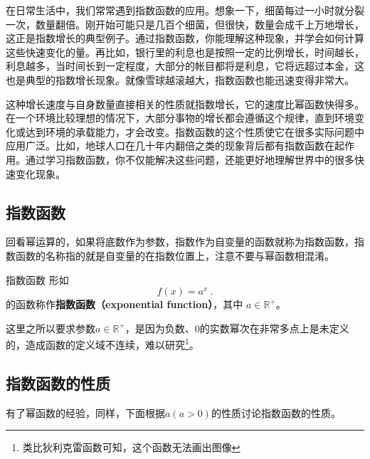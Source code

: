 

\begin{issues}
\issueDraft
\end{issues}

在日常生活中，我们常常遇到指数函数的应用。想象一下，细菌每过一小时就分裂一次，数量翻倍。刚开始可能只是几百个细菌，但很快，数量会成千上万地增长，这正是指数增长的典型例子。通过指数函数，你能理解这种现象，并学会如何计算这些快速变化的量。再比如，银行里的利息也是按照一定的比例增长，时间越长，利息越多，当时间长到一定程度，大部分的帐目都将是利息，它将远超过本金，这也是典型的指数增长现象。就像雪球越滚越大，指数函数也能迅速变得非常大。

这种增长速度与自身数量直接相关的性质就指数增长，它的速度比幂函数快得多。在一个环境比较理想的情况下，大部分事物的增长都会遵循这个规律，直到环境变化或达到环境的承载能力，才会改变。指数函数的这个性质使它在很多实际问题中应用广泛。比如，地球人口在几十年内翻倍之类的现象背后都有指数函数在起作用。通过学习指数函数，你不仅能解决这些问题，还能更好地理解世界中的很多快速变化现象。

\subsection{指数函数}

回看幂运算的，如果将底数作为参数，指数作为自变量的函数就称为指数函数，指数函数的名称指的就是自变量的在指数位置上，注意不要与幂函数相混淆。

\begin{definition}{指数函数}
形如
\begin{equation}
f(x) = a^x~.
\end{equation}
的函数称作\textbf{指数函数（exponential function）}，其中 $a\in\mathbb R^+$。
\end{definition}

这里之所以要求参数$a\in\mathbb R^+$，是因为负数、$0$的实数幂次在非常多点上是未定义的，造成函数的定义域不连续，难以研究\footnote{类比狄利克雷函数可知，这个函数无法画出图像}。

\subsection{指数函数的性质}

有了幂函数的经验，同样，下面根据$a(a>0)$的性质讨论指数函数的性质。

